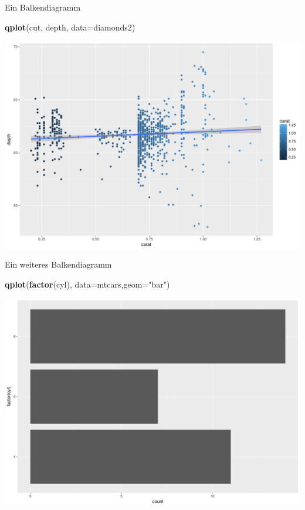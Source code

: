 \documentclass[ignorenonframetext,]{beamer}
\newenvironment{Shaded}{}{}
\newcommand{\KeywordTok}[1]{\textcolor[rgb]{0.00,0.44,0.13}{\textbf{{#1}}}}
\newcommand{\DataTypeTok}[1]{\textcolor[rgb]{0.56,0.13,0.00}{{#1}}}
\newcommand{\StringTok}[1]{\textcolor[rgb]{0.25,0.44,0.63}{{#1}}}
\newcommand{\NormalTok}[1]{{#1}}
\begin{document}
\begin{frame}[fragile]{Ein Balkendiagramm}

\begin{Shaded}
\begin{Highlighting}[]
\KeywordTok{qplot}\NormalTok{(cut, depth, }\DataTypeTok{data=}\NormalTok{diamonds2)}
\end{Highlighting}
\end{Shaded}

\includegraphics{R_intern_files/figure-beamer/unnamed-chunk-243-1.pdf}

\end{frame}

\begin{frame}[fragile]{Ein weiteres Balkendiagramm}

\begin{Shaded}
\begin{Highlighting}[]
\KeywordTok{qplot}\NormalTok{(}\KeywordTok{factor}\NormalTok{(cyl), }\DataTypeTok{data=}\NormalTok{mtcars,}\DataTypeTok{geom=}\StringTok{"bar"}\NormalTok{)}
\end{Highlighting}
\end{Shaded}

\includegraphics{R_intern_files/figure-beamer/unnamed-chunk-244-1.pdf}

\end{frame}
\end{document}
